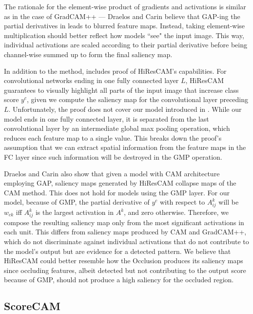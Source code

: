 The rationale for the element-wise product of gradients and activations is similar as in the case of GradCAM++ --- Draelos and Carin \cite{hires-cam} believe that GAP-ing the partial derivatives in  leads to blurred feature maps. 
Instead, taking element-wise multiplication should better reflect how models ``see" the input image.
This way, individual activations are scaled according to their partial derivative before being channel-wise summed up to form the final saliency map.

In addition to the method, \cite{hires-cam} includes proof of HiResCAM's capabilities.
For convolutional networks ending in one fully connected layer $L$, HiResCAM guarantees to visually highlight all parts of the input image that increase class score $y^c$, given we compute the saliency map for the convolutional layer preceding $L$.
Unfortunately, the proof does not cover our model introduced in .
While our model ends in one fully connected layer, it is separated from the last convolutional layer by an intermediate global max pooling operation, which reduces each feature map to a single value.
This breaks down the proof's assumption that we can extract spatial information from the feature maps in the FC layer since such information will be destroyed in the GMP operation. 

Draelos and Carin \cite{hires-cam} also show that given a model with CAM architecture employing GAP, saliency maps generated by HiResCAM collapse maps of the CAM method.
This does not hold for models using the GMP layer.
For our model, because of GMP, the partial derivative of $y^c$ with respect to $A^k_{ij}$ will be $w_{ck}$ iff $A^k_{ij}$ is the largest activation in $A^k$, and zero otherwise.
Therefore, we compose the resulting saliency map only from the most significant activations in each unit.
This differs from saliency maps produced by CAM and GradCAM++, which do not discriminate against individual activations that do not contribute to the model's output but are evidence for a detected pattern.
We believe that HiResCAM could better resemble how the Occlusion produces its saliency maps since occluding features, albeit detected but not contributing to the output score because of GMP, should not produce a high saliency for the occluded region.

\subsection{ScoreCAM}

